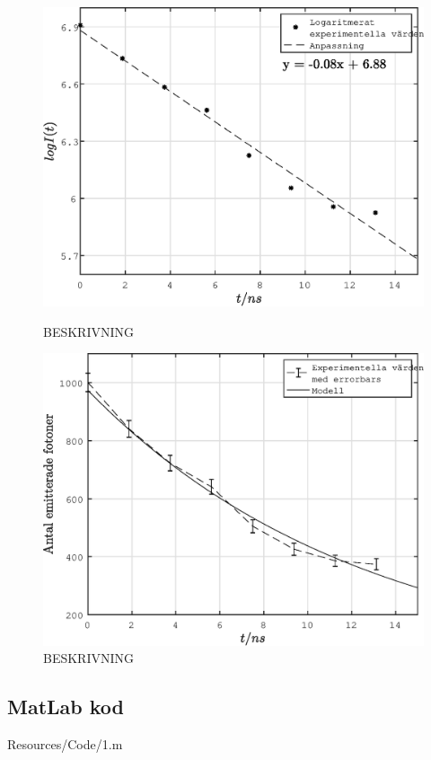 \begin{figure}[!htb]
        \includegraphics[width=\linewidth]{Resources/Graphics/fig1_2.eps}
        \caption{BESKRIVNING}\label{fig:1_2}
    \endminipage\hfill
        \includegraphics[width=\linewidth]{Resources/Graphics/fig1_3.eps}
        \caption{BESKRIVNING}\label{fig:1_3}
    \endminipage
\end{figure}


\np
\subsection*{MatLab kod}

 {Resources/Code/1.m}
